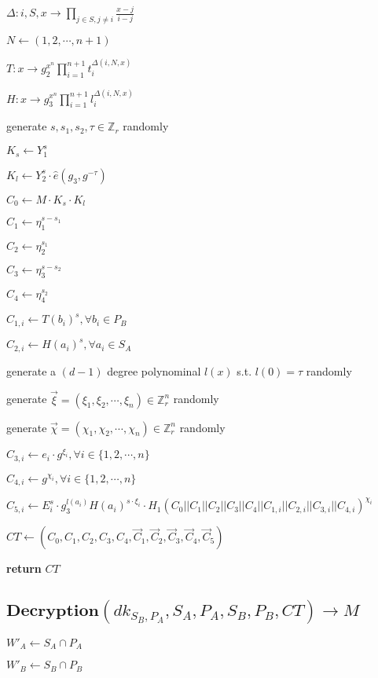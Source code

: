 \documentclass[a4paper]{article}
\begin{document}
$\Delta: i, S, x \rightarrow \prod\limits_{j \in S, j \neq i} \frac{x - j}{i - j}$

$N \gets (1, 2, \cdots, n + 1)$

$T: x \rightarrow g_2^{x^n} \prod\limits_{i = 1}^{n + 1} t_i^{\Delta(i, N, x)}$

$H: x \rightarrow g_3^{x^n} \prod\limits_{i = 1}^{n + 1} l_i^{\Delta(i, N, x)}$

generate $s, s_1, s_2, \tau \in \mathbb{Z}_r$ randomly

$K_s \gets Y_1^s$

$K_l \gets Y_2^s \cdot \hat{e}(g_3, g^{-\tau})$

$C_0 \gets M \cdot K_s \cdot K_l$

$C_1 \gets \eta_1^{s - s_1}$

$C_2 \gets \eta_2^{s_1}$

$C_3 \gets \eta_3^{s - s_2}$

$C_4 \gets \eta_4^{s_2}$

$C_{1, i} \gets T(b_i)^s, \forall b_i \in P_B$

$C_{2, i} \gets H(a_i)^s, \forall a_i \in S_A$

generate a $(d - 1)$ degree polynominal $l(x)$ s.t. $l(0) = \tau$ randomly

generate $\vec{\xi} = (\xi_1, \xi_2, \cdots, \xi_n) \in \mathbb{Z}_r^n$ randomly

generate $\vec{\chi} = (\chi_1, \chi_2, \cdots, \chi_n) \in \mathbb{Z}_r^n$ randomly

$C_{3, i} \gets e_i \cdot g^{\xi_i}, \forall i \in \{1, 2, \cdots, n\}$

$C_{4, i} \gets g^{\chi_i}, \forall i \in \{1, 2, \cdots, n\}$

$C_{5, i} \gets E_i^s \cdot g_3^{l(a_i)} H(a_i)^{s \cdot \xi_i} \cdot H_1(C_0 || C_1 || C_2 || C_3 || C_4 || C_{1, i} || C_{2, i} || C_{3, i} || C_{4, i})^{\chi_i}$

$\textit{CT} \gets (C_0, C_1, C_2, C_3, C_4, \vec{C}_1, \vec{C}_2, \vec{C}_3, \vec{C}_4, \vec{C}_5)$

\textbf{return} $\textit{CT}$

\subsection{$\textbf{Decryption}(\textit{dk}_{S_B, P_A}, S_A, P_A, S_B, P_B, \textit{CT}) \rightarrow M$}

$W'_A \gets S_A \cap P_A$

$W'_B \gets S_B \cap P_B$
\end{document}
